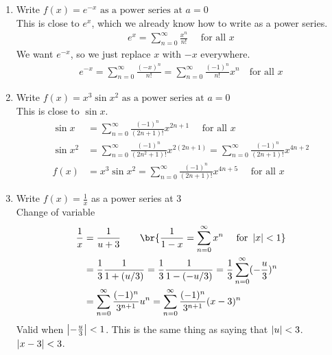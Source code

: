 \begin{enumerate}
    \item Write \(f(x) = e^{-x} \text{ as a power series at } a = 0\) \\
          This is close to \(e^x\), which we already know how to write as a power series. \begin{align*}
              e^x = \sum_{n = 0}^{\infty} \frac{x^n}{n!} \quad \text{ for all } x
          \end{align*}
          We want \(e^{-x}\), so we just replace \(x\) with \(-x\) everywhere. \begin{align*}
              e^{-x} = \sum_{n = 0}^{\infty} \frac{(-x)^n}{n!} = \sum_{n = 0}^{\infty} \frac{(-1)^n}{n!} x^n \quad \text{for all } x
          \end{align*}
    \item Write \(f(x) = x^3 \sin x^2 \text{ as a power series at } a = 0\) \\
          This is close to \(\sin x\). \begin{align*}
              \sin x   & = \sum_{n = 0}^{\infty} \frac{(-1)^n}{(2n+1)!} x^{2n+1} \quad \text{ for all } x                                       \\
              \sin x^2 & = \sum_{n = 0}^{\infty} \frac{(-1)^n}{(2n^2 + 1)!} x^{2(2n+1)} = \sum_{n = 0}^{\infty} \frac{(-1)^n}{(2n+1)!} x^{4n+2} \\
              f(x)     & = x^3 \sin x^2 = \sum_{n = 0}^{\infty} \frac{(-1)^n}{(2n+1)!} x^{4n+5} \quad \text{ for all    } x
          \end{align*}
    \item Write \(f(x) = \frac{1}{x}\) as a power series at \(3\) \\
          Change of variable  \begin{align*}
              \frac{1}{x} & = \frac{1}{u+3} \qquad \br{\frac{1}{1-x} = \sum_{n = 0}^{\infty} x^n \quad \text{ for } \abs{x} < 1}                    \\
                          & = \frac{1}{3} \frac{1}{1 + (u/3)} = \frac{1}{3} \frac{1}{1-(-u/3)} = \frac{1}{3} \sum_{n = 0}^{\infty} (-\frac{u}{3})^n \\
                          & = \sum_{n = 0}^{\infty} \frac{(-1)^n}{3^{n+1}} u^n = \sum_{n = 0}^{\infty} \frac{(-1)^n}{3^{n+1}} (x-3)^n
          \end{align*}
          Valid when \(\left\lvert -\frac{u}{3} \right\rvert < 1\). This is the same thing as saying that \(\left\lvert u \right\rvert < 3\). \(\left\lvert x - 3 \right\rvert < 3\).
\end{enumerate}

